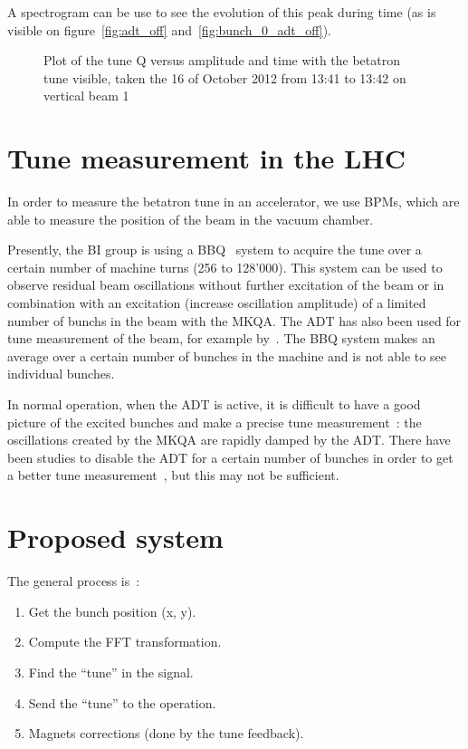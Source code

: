 A spectrogram can be use to see the evolution of this peak during time (as is visible on figure~\ref{fig:adt_off} and~\ref{fig:bunch_0_adt_off}).

\begin{figure}[H]
\centering
\caption{Plot of the tune Q versus amplitude and time with the betatron tune visible, taken the 16 of October 2012 from 13:41 to 13:42 on vertical beam 1}
\label{fig:moutain_range}
\end{figure}

\section{Tune measurement in the LHC}

In order to measure the betatron tune in an accelerator, we use \glspl{BPM}, which are able to measure the position of the beam in the vacuum chamber.

Presently, the \gls{BI} group is using a \gls{BBQ}~\cite{Boccardi:1156349} system to acquire the tune over a certain number of machine turns (256 to 128'000). This system can be used to observe residual beam oscillations without further excitation of the beam or in combination with an excitation (increase oscillation amplitude) of a limited number of \glspl{bunch} in the beam with the \gls{MKQA}. The \Gls{ADT} has also been used for tune measurement of the beam, for example by~\cite{HofleEvian10}. The \gls{BBQ} system makes an average over a certain number of bunches in the machine and is not able to see individual bunches.

In normal operation, when the \gls{ADT} is active, it is difficult to have a good picture of the excited bunches and make a precise tune measurement~: the oscillations created by the \gls{MKQA} are rapidly damped by the \gls{ADT}. There have been studies to disable the \gls{ADT} for a certain number of bunches in order to get a better tune measurement~\cite{HofleEvian11}, but this may not be sufficient.

\section{Proposed system}

The general process is~:
\begin{enumerate}
\item Get the bunch position (x, y).
\item Compute the \gls{FFT} transformation.
\item Find the ``tune'' in the signal.
\item Send the ``tune'' to the operation.
\item Magnets corrections (done by the tune feedback).
\end{enumerate}

